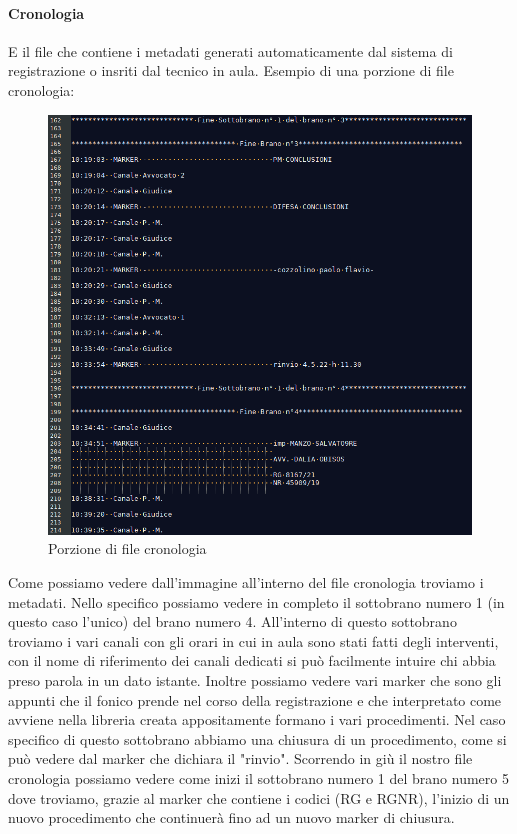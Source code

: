 \paragraph{Cronologia}
E il file che contiene i metadati generati automaticamente dal sistema di registrazione o insriti dal tecnico in aula.
Esempio di una porzione di file cronologia:
\begin{figure}[H]
  \centering
  \includegraphics[width=\textwidth]{immagini/file-cronologia.png}
  \caption{Porzione di file cronologia}
\end{figure}
Come possiamo vedere dall'immagine all'interno del file cronologia troviamo i metadati. Nello specifico possiamo vedere in completo il sottobrano numero 1 (in questo caso l'unico)
del brano numero 4. All'interno di questo sottobrano troviamo i vari canali con gli orari in cui in aula sono stati fatti degli interventi, con il nome di riferimento dei canali dedicati
si può facilmente intuire chi abbia preso parola in un dato istante. Inoltre possiamo vedere vari marker che sono gli appunti che il fonico prende nel corso della registrazione e che
interpretato come avviene nella libreria creata appositamente formano i vari procedimenti. Nel caso specifico di questo sottobrano abbiamo una chiusura di un procedimento, come si
può vedere dal marker che dichiara il "rinvio". Scorrendo in giù il nostro file cronologia possiamo vedere come inizi il sottobrano numero 1 del brano numero 5 dove troviamo, grazie al
marker che contiene i codici (RG e RGNR), l'inizio di un nuovo procedimento che continuerà fino ad un nuovo marker di chiusura.
